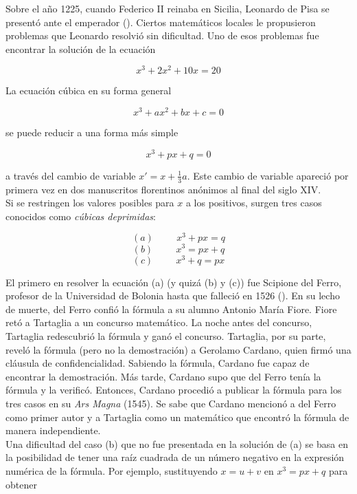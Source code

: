 \documentclass[../main.tex]{memoir}
\begin{document}
Sobre el año 1225, cuando Federico II reinaba en Sicilia, Leonardo de Pisa se presentó ante el emperador (\cite{nahin1998}). Ciertos matemáticos locales le propusieron problemas que Leonardo resolvió sin dificultad. Uno de esos problemas fue encontrar la solución de la ecuación

$$x^3+2x^2+10x=20$$

La ecuación cúbica en su forma general

$$ x^3+ax^2+bx+c = 0$$

se puede reducir a una forma más simple

$$x^3+px+q = 0$$

a través del cambio de variable $x'  = x + \frac{1}{3}a$. Este cambio de variable apareció por primera vez en dos manuscritos florentinos anónimos al final del siglo XIV. \\

Si se restringen los valores posibles para $x$ a los positivos, surgen tres casos conocidos como \textit{cúbicas deprimidas}:

$$ (a) \hspace{1cm} x^3+px = q $$
$$ (b) \hspace{1cm} x^3 = px+q $$
$$ (c) \hspace{1cm} x^3+q = px $$

El primero en resolver la ecuación (a) (y quizá (b) y (c)) fue Scipione del Ferro, profesor de la Universidad de Bolonia hasta que falleció en 1526 (\cite{mactutor}). En su lecho de muerte, del Ferro confió la fórmula a su alumno Antonio María Fiore. Fiore retó a Tartaglia a un concurso matemático. La noche antes del concurso, Tartaglia redescubrió la fórmula y ganó el concurso. Tartaglia, por su parte, reveló la fórmula (pero no la demostración) a Gerolamo Cardano, quien firmó una cláusula de confidencialidad. Sabiendo la fórmula, Cardano fue capaz de encontrar la demostración. Más tarde, Cardano supo que del Ferro tenía la fórmula y la verificó. Entonces, Cardano procedió a publicar la fórmula para los tres casos en su \textit{Ars Magna} (1545). Se sabe que Cardano mencionó a del Ferro como primer autor y a Tartaglia como un matemático que encontró la fórmula de manera independiente. \\

Una dificultad del caso (b) que no fue presentada en la solución de (a) se basa en la posibilidad de tener una raíz cuadrada de un número negativo en la expresión numérica de la fórmula. Por ejemplo, sustituyendo $x = u+v$ en $x^3=px+q$ para obtener
\end{document}
